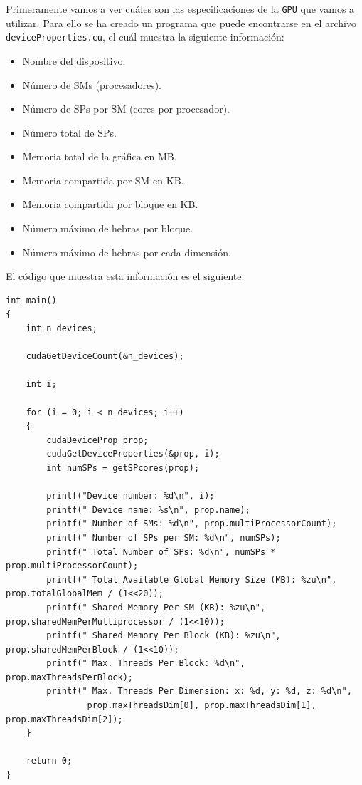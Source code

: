 \documentclass[11pt,a4paper]{article}
\begin{document}
Primeramente vamos a ver cuáles son las especificaciones de la \texttt{GPU} que vamos a
utilizar. Para ello se ha creado un programa que puede encontrarse en el archivo
\texttt{deviceProperties.cu}, el cuál muestra la siguiente información:

\begin{itemize}
  \item Nombre del dispositivo.
  \item Número de SMs (procesadores).
  \item Número de SPs por SM (cores por procesador).
  \item Número total de SPs.
  \item Memoria total de la gráfica en MB.
  \item Memoria compartida por SM en KB.
  \item Memoria compartida por bloque en KB.
  \item Número máximo de hebras por bloque.
  \item Número máximo de hebras por cada dimensión.
\end{itemize}

El código que muestra esta información es el siguiente:

\begin{lstlisting}
int main()
{
    int n_devices;

    cudaGetDeviceCount(&n_devices);

    int i;

    for (i = 0; i < n_devices; i++)
    {
        cudaDeviceProp prop;
        cudaGetDeviceProperties(&prop, i);
        int numSPs = getSPcores(prop);

        printf("Device number: %d\n", i);
        printf(" Device name: %s\n", prop.name);
        printf(" Number of SMs: %d\n", prop.multiProcessorCount);
        printf(" Number of SPs per SM: %d\n", numSPs);
        printf(" Total Number of SPs: %d\n", numSPs * prop.multiProcessorCount);
        printf(" Total Available Global Memory Size (MB): %zu\n", prop.totalGlobalMem / (1<<20));
        printf(" Shared Memory Per SM (KB): %zu\n", prop.sharedMemPerMultiprocessor / (1<<10));
        printf(" Shared Memory Per Block (KB): %zu\n", prop.sharedMemPerBlock / (1<<10));
        printf(" Max. Threads Per Block: %d\n", prop.maxThreadsPerBlock);
        printf(" Max. Threads Per Dimension: x: %d, y: %d, z: %d\n",
                prop.maxThreadsDim[0], prop.maxThreadsDim[1], prop.maxThreadsDim[2]);
    }

    return 0;
}
\end{lstlisting}
\end{document}
